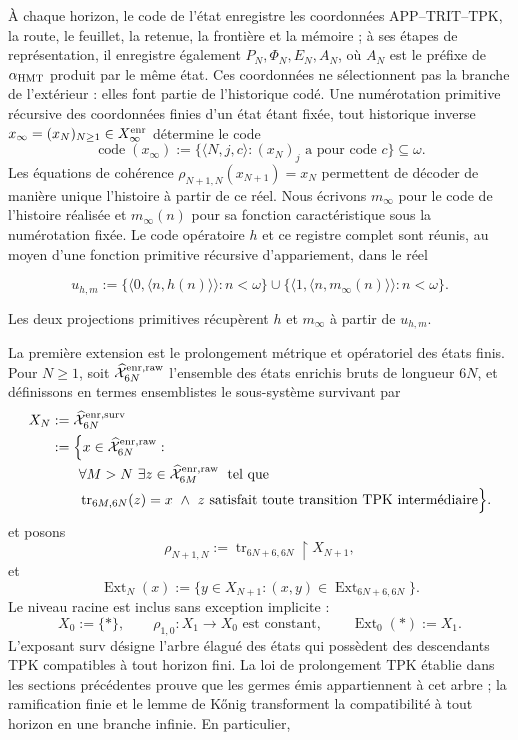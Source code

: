 À chaque horizon, le code de l'état enregistre les coordonnées APP--TRIT--TPK, la route, le feuillet, la retenue, la frontière et la mémoire ; à ses étapes de représentation, il enregistre également \(P_N,\Phi_N,E_N,A_N\), où \(A_N\) est le préfixe de \(\alpha_{\rm HMT}\) produit par le même état. Ces coordonnées ne sélectionnent pas la branche de l'extérieur : elles font partie de l'historique codé. Une numérotation primitive récursive des coordonnées finies d'un état étant fixée, tout historique inverse \(x_\infty=(x_N)_{N\geq1}\in X_\infty^{\rm enr}\) détermine le code
\[
 \operatorname{code}(x_\infty)
 :=\{\langle N,j,c\rangle:(x_N)_j\text{ a pour code }c\}\subseteq\omega.
\]
Les équations de cohérence
\(\rho_{N+1,N}(x_{N+1})=x_N\) permettent de décoder de manière unique
l’histoire à partir de ce réel. Nous écrivons \(m_\infty\) pour le code de
l’histoire réalisée et \(m_\infty(n)\) pour sa fonction caractéristique sous la
numérotation fixée. Le code opératoire \(h\) et ce registre complet sont
réunis, au moyen d’une fonction primitive récursive d’appariement, dans le réel

\[
 u_{h,m}:=
 \{\langle0,\langle n,h(n)\rangle\rangle:n<\omega\}
 \cup
 \{\langle1,\langle n,m_\infty(n)\rangle\rangle:n<\omega\}.
\tag{33a}\label{eq:ch-codigo-conjunto}
\]

Les deux projections primitives récupèrent \(h\) et \(m_\infty\) à partir de \(u_{h,m}\).

La première extension est le prolongement métrique et opératoriel des états finis. Pour \(N\ge1\), soit \(\widehat{\mathcal X}^{\rm enr,raw}_{6N}\) l'ensemble des états enrichis bruts de longueur \(6N\), et définissons en termes ensemblistes le sous-système survivant par
\[
\begin{aligned}
 X_N
 &:=\widehat{\mathcal X}^{\rm enr,surv}_{6N}\\
 &:=\Bigl\{x\in\widehat{\mathcal X}^{\rm enr,raw}_{6N}:\\[-.2ex]
 &\qquad\forall M>N\ \exists z\in
   \widehat{\mathcal X}^{\rm enr,raw}_{6M}\;\text{ tel que}\\[-.2ex]
 &\qquad\operatorname{tr}_{6M,6N}(z)=x\ \wedge\
   z\text{ satisfait toute transition TPK intermédiaire}\Bigr\}.
\end{aligned}
\]
et posons
\[
 \rho_{N+1,N}:=\operatorname{tr}_{6N+6,6N}\!\upharpoonright X_{N+1},
\]
et
\[
 \operatorname{Ext}_N(x):=
 \{y\in X_{N+1}:(x,y)\in
 \operatorname{Ext}_{6N+6,6N}\}.
\]
Le niveau racine est inclus sans exception implicite :
\[
 X_0:=\{\ast\},\qquad
 \rho_{1,0}:X_1\to X_0\text{ est constant},\qquad
 \operatorname{Ext}_0(\ast):=X_1.
\]
L’exposant \(\mathrm{surv}\) désigne
l’arbre élagué des états qui possèdent des descendants TPK compatibles à tout
horizon fini. La loi de prolongement TPK établie dans les sections
précédentes prouve que les germes
émis appartiennent à cet arbre ; la ramification finie et le lemme de Kőnig
transforment la compatibilité à tout horizon en une branche infinie. En
particulier,

